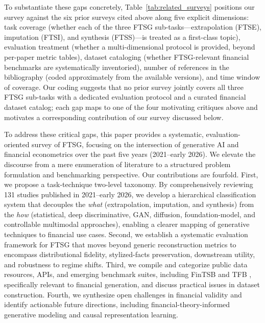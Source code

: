 To substantiate these gaps concretely, Table~\ref{tab:related_surveys} positions our survey against the six prior surveys cited above along five explicit dimensions: task coverage (whether each of the three FTSG sub-tasks---extrapolation (FTSE), imputation (FTSI), and synthesis (FTSS)---is treated as a first-class topic), evaluation treatment (whether a multi-dimensional protocol is provided, beyond per-paper metric tables), dataset cataloging (whether FTSG-relevant financial benchmarks are systematically inventoried), number of references in the bibliography (coded approximately from the available versions), and time window of coverage. Our coding suggests that no prior survey jointly covers all three FTSG sub-tasks with a dedicated evaluation protocol and a curated financial dataset catalog; each gap maps to one of the four motivating critiques above and motivates a corresponding contribution of our survey discussed below.

To address these critical gaps, this paper provides a systematic, evaluation-oriented survey of FTSG, focusing on the intersection of generative AI and financial econometrics over the past five years (2021--early 2026). We elevate the discourse from a mere enumeration of literature to a structured problem formulation and benchmarking perspective. Our contributions are fourfold. First, we propose a task-technique two-level taxonomy. By comprehensively reviewing 131 studies published in 2021--early 2026, we develop a hierarchical classification system that decouples the \textit{what} (extrapolation, imputation, and synthesis) from the \textit{how} (statistical, deep discriminative, GAN, diffusion, foundation-model, and controllable multimodal approaches), enabling a clearer mapping of generative techniques to financial use cases. Second, we establish a systematic evaluation framework for FTSG that moves beyond generic reconstruction metrics to encompass distributional fidelity, stylized-facts preservation, downstream utility, and robustness to regime shifts. Third, we compile and categorize public data resources, APIs, and emerging benchmark suites, including FinTSB \citep{hu2025fintsb} and TFB \citep{TFB}, specifically relevant to financial generation, and discuss practical issues in dataset construction. Fourth, we synthesize open challenges in financial validity and identify actionable future directions, including financial-theory-informed generative modeling and causal representation learning.





